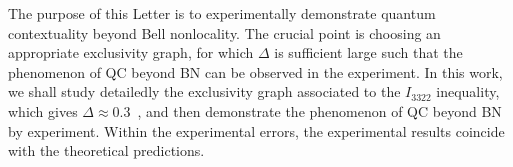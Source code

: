 \documentclass[prl,letterpaper,english,reprint,nofootinbib,aps,superscriptaddress,showpacs,showkeys]{revtex4-1}
\theoremstyle{definition}
\theoremstyle{remark}
\begin{document}
The purpose of this Letter is to experimentally demonstrate quantum contextuality beyond Bell nonlocality. The crucial point is choosing an appropriate exclusivity graph, for which $\Delta$ is sufficient large such that the phenomenon of QC beyond BN can be observed in the experiment. In this work, we shall study detailedly the exclusivity graph associated to the $I_{3322}$ inequality, which gives $\Delta\approx0.3$~\cite{RDLTC14}, and then demonstrate the phenomenon of QC beyond BN by experiment. Within the experimental errors, the experimental results coincide with the theoretical predictions.

%
%
%
\end{document}
